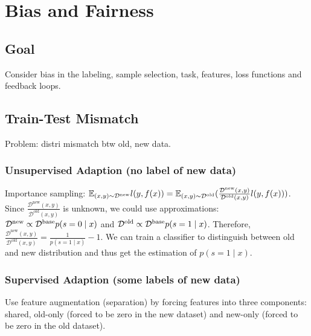 \section{Bias and Fairness}

\subsection*{Goal}

Consider bias in the labeling, sample selection, task, features, loss functions and feedback loops.

\subsection*{Train-Test Mismatch}

Problem: distri mismatch btw old, new data.

\subsubsection*{Unsupervised Adaption (no label of new data)}
Importance sampling: $\mathbb{E}_{(x,y)\sim \mathcal{D}^{\text{new}}} l(y, f(x)) = \mathbb{E}_{(x,y)\sim \mathcal{D}^{\text{old}}} (\frac{\mathcal{D}^{\text{new}}(x,y)}{\mathcal{D}^{\text{old}}(x,y)}l(y,f(x)))$. Since $\frac{\mathcal{D}^{\text{new}}(x,y)}{\mathcal{D}^{\text{old}}(x,y)}$ is unknown, we could use approximations: $\mathcal{D}^{\text{new}} \propto \mathcal{D}^{\text{base}}p(s=0\mid x)$ and $\mathcal{D}^{\text{old}} \propto \mathcal{D}^{\text{base}}p(s=1\mid x)$. Therefore, $\frac{\mathcal{D}^{\text{new}}(x,y)}{\mathcal{D}^{\text{old}}(x,y)} = \frac{1}{p(s=1\mid x)}-1$. We can train a classifier to distinguish between old and new distribution and thus get the estimation of $p(s=1\mid x)$.

\subsubsection*{Supervised Adaption (some labels of new data)}

Use feature augmentation (separation) by forcing features into three components: shared, old-only (forced to be zero in the new dataset) and new-only (forced to be zero in the old dataset).
